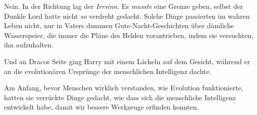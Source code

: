 Nein. In der Richtung lag der \emph{Irrsinn}. Es \emph{musste} eine Grenze geben, selbst der Dunkle Lord hatte nicht \emph{so} verdreht gedacht. Solche Dinge passierten im wahren Leben nicht, nur in Vaters dummen Gute-Nacht-Geschichten über dämliche Wasserspeier, die immer die Pläne des Helden vorantrieben, indem sie versuchten, ihn aufzuhalten.

\later

Und an Dracos Seite ging Harry mit einem Lächeln auf dem Gesicht, während er an die evolutionären Ursprünge der menschlichen Intelligenz dachte.

Am Anfang, bevor Menschen wirklich verstanden, wie Evolution funktionierte, hatten sie verrückte Dinge gedacht, wie dass sich die menschliche Intelligenz entwickelt habe, damit wir bessere Werkzeuge erfinden konnten.

